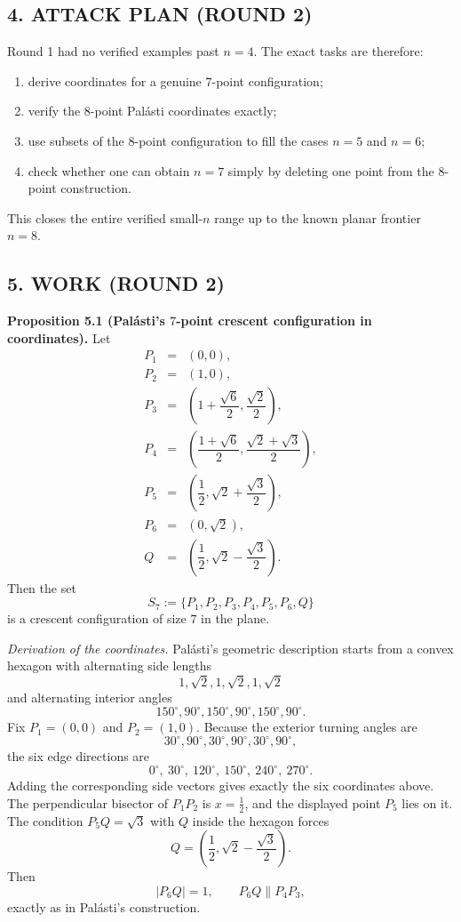 \subsection*{4. ATTACK PLAN (ROUND 2)}
Round 1 had no verified examples past $n=4$. The exact tasks are therefore:
\begin{enumerate}
\item derive coordinates for a genuine $7$-point configuration;
\item verify the $8$-point Pal\'asti coordinates exactly;
\item use subsets of the $8$-point configuration to fill the cases $n=5$ and $n=6$;
\item check whether one can obtain $n=7$ simply by deleting one point from the $8$-point construction.
\end{enumerate}
This closes the entire verified small-$n$ range up to the known planar frontier $n=8$.

\subsection*{5. WORK (ROUND 2)}

\medskip
\noindent\textbf{Proposition 5.1 (Pal\'asti's $7$-point crescent configuration in coordinates).}
Let
\[
\begin{array}{rcl}
P_1&=&(0,0),\\[1mm]
P_2&=&(1,0),\\[1mm]
P_3&=&\left(1+\dfrac{\sqrt6}{2},\dfrac{\sqrt2}{2}\right),\\[3mm]
P_4&=&\left(\dfrac{1+\sqrt6}{2},\dfrac{\sqrt2+\sqrt3}{2}\right),\\[3mm]
P_5&=&\left(\dfrac12,\sqrt2+\dfrac{\sqrt3}{2}\right),\\[3mm]
P_6&=&(0,\sqrt2),\\[1mm]
Q&=&\left(\dfrac12,\sqrt2-\dfrac{\sqrt3}{2}\right).
\end{array}
\]
Then the set
\[
S_7:=\{P_1,P_2,P_3,P_4,P_5,P_6,Q\}
\]
is a crescent configuration of size $7$ in the plane.

\smallskip
\noindent\emph{Derivation of the coordinates.}
Pal\'asti's geometric description starts from a convex hexagon with alternating side lengths
\[
1,\sqrt2,1,\sqrt2,1,\sqrt2
\]
and alternating interior angles
\[
150^\circ,90^\circ,150^\circ,90^\circ,150^\circ,90^\circ.
\]
Fix $P_1=(0,0)$ and $P_2=(1,0)$. Because the exterior turning angles are
\[
30^\circ,90^\circ,30^\circ,90^\circ,30^\circ,90^\circ,
\]
the six edge directions are
\[
0^\circ,\ 30^\circ,\ 120^\circ,\ 150^\circ,\ 240^\circ,\ 270^\circ.
\]
Adding the corresponding side vectors gives exactly the six coordinates above. The perpendicular bisector of $P_1P_2$ is $x=\frac12$, and the displayed point $P_5$ lies on it. The condition $P_5Q=\sqrt3$ with $Q$ inside the hexagon forces
\[
Q=\left(\frac12,\sqrt2-\frac{\sqrt3}{2}\right).
\]
Then
\[
|P_6Q|=1,\qquad P_6Q\parallel P_4P_3,
\]
exactly as in Pal\'asti's construction.

